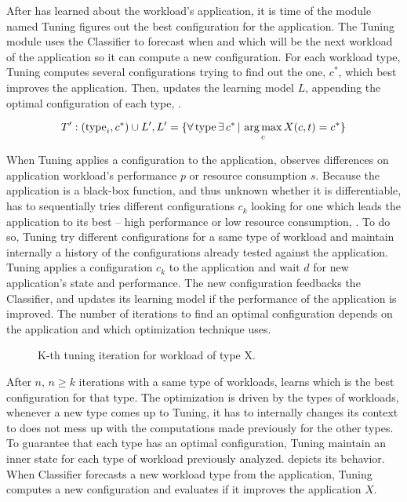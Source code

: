 After \name has learned about the workload's application,  it is time of the module named
Tuning figures out the best configuration for the application. The Tuning module
uses the Classifier to forecast when and which will be the next workload of the
application so it can compute a new configuration. For each workload type,
Tuning computes several configurations trying to find out the one, $c^{*}$,
which best improves the application. Then, \name updates the learning model $L$,
appending the optimal configuration of each type, .

\begin{equation}
  T': (\text{type}_i, c^{*} )\cup L', L' = \{ \forall\, \text{type}\, \exists\, c^{*}\, |\, \operatorname*{arg\,max}_c X(c,t) = c^{*}\}
  \label{eq:training-updated}
\end{equation}

When Tuning applies a configuration to the application, \name observes
differences on application workload's performance $p$ or resource consumption
$s$. Because the application is a black-box function, and thus unknown whether
it is differentiable, \name has to sequentially tries different configurations
$c_k$ looking for one which leads the application to its best -- high
performance or low resource consumption, . To do so,
Tuning try different configurations for a same type of workload and maintain
internally a history of the configurations already tested against the
application.  Tuning applies a configuration $c_k$ to the application and wait
$d$ for new application's state and performance. The new configuration feedbacks
the Classifier, and updates its learning model if the performance of the
application is improved. The number of iterations to find an optimal
configuration depends on the application and which optimization technique \name
uses.

\begin{figure*}[htp]
    \centering
    \def\svgwidth{\textwidth}
    \scalebox{1.0}{}
    \caption{K-th tuning iteration for workload of type X.}
    \label{fig:tuning-overview}
\end{figure*}

After $n,\, n \geq k$ iterations with a same type of workloads, \name learns
which is the best configuration for that type. The optimization is driven by the
types of workloads, whenever a new type comes up to Tuning, it has to internally
changes its context to does not mess up with the computations made previously
for the other types.  To guarantee that each type has an optimal configuration,
Tuning maintain an inner state for each type of workload previously analyzed.
 depicts its behavior. When Classifier forecasts a new
workload type from the application, Tuning computes a new configuration and
evaluates if it improves the application $X$.

